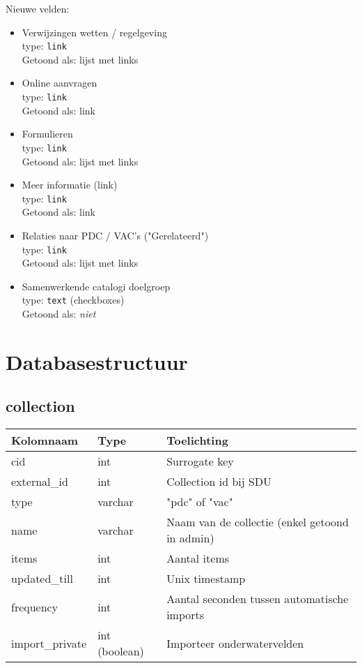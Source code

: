 \documentclass[12pt]{article}
\begin{document}
Nieuwe velden:
\begin{itemize}
\item Verwijzingen wetten / regelgeving \\
type: \texttt{link} \\
Getoond als: lijst met links
\item Online aanvragen \\
type: \texttt{link} \\
Getoond als: link
\item Formulieren \\
type: \texttt{link} \\
Getoond als: lijst met links
\item Meer informatie (link) \\
type: \texttt{link} \\
Getoond als: link
\item Relaties naar PDC / VAC's ("Gerelateerd")\\
type: \texttt{link} \\
Getoond als: lijst met links
\item Samenwerkende catalogi doelgroep \\
type: \texttt{text} (checkboxes) \\
Getoond als: \emph{niet}
\end{itemize}

\clearpage
\section{Databasestructuur}

\subsection*{collection}
\begin{tabular}{p{} | p{} | p{} }
\textbf{Kolomnaam} & \textbf{Type} & \textbf{Toelichting} \\
\hline
cid & int & Surrogate key \\
external\_id & int & Collection id bij SDU \\
type & varchar & "pdc" of "vac" \\
name & varchar & Naam van de collectie (enkel getoond in admin) \\
items & int & Aantal items \\
updated\_till & int & Unix timestamp \\
frequency & int & Aantal seconden tussen automatische imports \\
import\_private & int (boolean) & Importeer onderwatervelden
\end{tabular}
\end{document}
